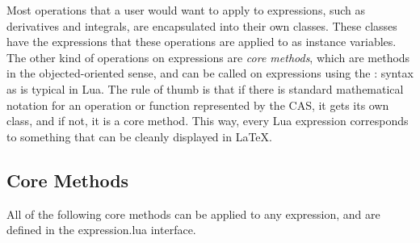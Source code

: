 \documentclass{article}
\begin{document}
Most operations that a user would want to apply to expressions, such as derivatives and integrals, are encapsulated into their own classes. These classes have the expressions that these operations are applied to as instance variables. The other kind of operations on expressions are \emph{core methods}, which are methods in the objected-oriented sense, and can be called on expressions using the {\ttfamily :} syntax as is typical in Lua. The rule of thumb is that if there is standard mathematical notation for an operation or function represented by the CAS, it gets its own class, and if not, it is a core method. This way, every Lua expression corresponds to something that can be cleanly displayed in \LaTeX{}.


\subsection{Core Methods}

All of the following core methods can be applied to any expression, and are defined in the {\ttfamily expression.lua} interface.
\end{document}
